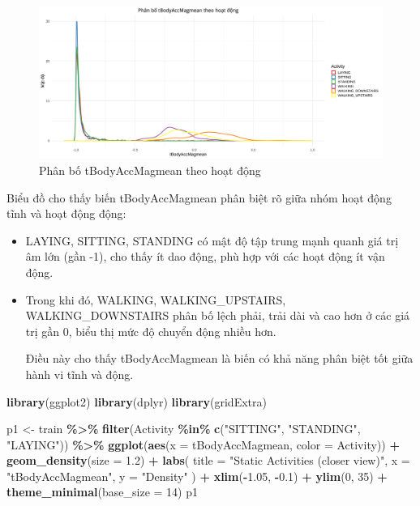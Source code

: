 \documentclass[
]{article}
\newenvironment{Shaded}{\begin{snugshade}}{\end{snugshade}}
\newcommand{\AttributeTok}[1]{\textcolor[rgb]{0.13,0.29,0.53}{#1}}
\newcommand{\DecValTok}[1]{\textcolor[rgb]{0.00,0.00,0.81}{#1}}
\newcommand{\FloatTok}[1]{\textcolor[rgb]{0.00,0.00,0.81}{#1}}
\newcommand{\FunctionTok}[1]{\textcolor[rgb]{0.13,0.29,0.53}{\textbf{#1}}}
\newcommand{\NormalTok}[1]{#1}
\newcommand{\OtherTok}[1]{\textcolor[rgb]{0.56,0.35,0.01}{#1}}
\newcommand{\SpecialCharTok}[1]{\textcolor[rgb]{0.81,0.36,0.00}{\textbf{#1}}}
\newcommand{\StringTok}[1]{\textcolor[rgb]{0.31,0.60,0.02}{#1}}
\begin{document}
\begin{figure}
\centering
\includegraphics{report_files/figure-latex/unnamed-chunk-11-1.pdf}
\caption{Phân bố tBodyAccMagmean theo hoạt động}
\end{figure}

Biểu đồ cho thấy biến tBodyAccMagmean phân biệt rõ giữa nhóm hoạt động
tĩnh và hoạt động động:

\begin{itemize}
\item
  LAYING, SITTING, STANDING có mật độ tập trung mạnh quanh giá trị âm
  lớn (gần -1), cho thấy ít dao động, phù hợp với các hoạt động ít vận
  động.
\item
  Trong khi đó, WALKING, WALKING\_UPSTAIRS, WALKING\_DOWNSTAIRS phân bố
  lệch phải, trải dài và cao hơn ở các giá trị gần 0, biểu thị mức độ
  chuyển động nhiều hơn.

  Điều này cho thấy tBodyAccMagmean là biến có khả năng phân biệt tốt
  giữa hành vi tĩnh và động.
\end{itemize}

\begin{Shaded}
\begin{Highlighting}[]
\FunctionTok{library}\NormalTok{(ggplot2)}
\FunctionTok{library}\NormalTok{(dplyr)}
\FunctionTok{library}\NormalTok{(gridExtra)}

\NormalTok{p1 }\OtherTok{\textless{}{-}}\NormalTok{ train }\SpecialCharTok{\%\textgreater{}\%}
  \FunctionTok{filter}\NormalTok{(Activity }\SpecialCharTok{\%in\%} \FunctionTok{c}\NormalTok{(}\StringTok{"SITTING"}\NormalTok{, }\StringTok{"STANDING"}\NormalTok{, }\StringTok{"LAYING"}\NormalTok{)) }\SpecialCharTok{\%\textgreater{}\%}
  \FunctionTok{ggplot}\NormalTok{(}\FunctionTok{aes}\NormalTok{(}\AttributeTok{x =}\NormalTok{ tBodyAccMagmean, }\AttributeTok{color =}\NormalTok{ Activity)) }\SpecialCharTok{+}
  \FunctionTok{geom\_density}\NormalTok{(}\AttributeTok{size =} \FloatTok{1.2}\NormalTok{) }\SpecialCharTok{+}
  \FunctionTok{labs}\NormalTok{(}
    \AttributeTok{title =} \StringTok{"Static Activities (closer view)"}\NormalTok{,}
    \AttributeTok{x =} \StringTok{"tBodyAccMagmean"}\NormalTok{,}
    \AttributeTok{y =} \StringTok{"Density"}
\NormalTok{  ) }\SpecialCharTok{+}
  \FunctionTok{xlim}\NormalTok{(}\SpecialCharTok{{-}}\FloatTok{1.05}\NormalTok{, }\SpecialCharTok{{-}}\FloatTok{0.1}\NormalTok{) }\SpecialCharTok{+}
  \FunctionTok{ylim}\NormalTok{(}\DecValTok{0}\NormalTok{, }\DecValTok{35}\NormalTok{) }\SpecialCharTok{+}
  \FunctionTok{theme\_minimal}\NormalTok{(}\AttributeTok{base\_size =} \DecValTok{14}\NormalTok{)}
\NormalTok{p1}
\end{Highlighting}
\end{Shaded}
\end{document}
